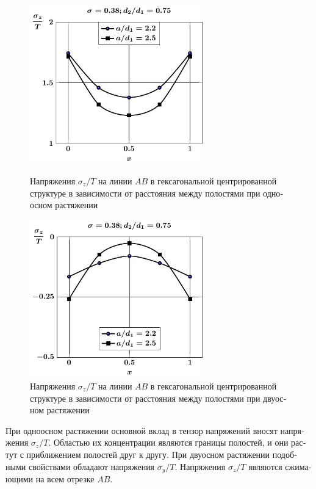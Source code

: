 \begin{russian}
\begin{figure}[h!]
\centering\footnotesize
\parbox[b]{7.5cm}{\centering\includegraphics[width=7.5cm]{cav13-a-d75-t1-sig_z.pdf}
\caption{Напряжения $\sigma_z/T$ на линии $AB$ в гексагональной центрированной структуре в зависимости от расстояния между полостями при одноосном растяжении 
\label{f:9:48}}}\hfil\hfil
\parbox[b]{7.5cm}{\centering\includegraphics[width=7.5cm]{cav13-a-d75-t2-sig_z.pdf}
\caption{Напряжения $\sigma_z/T$ на линии $AB$ в гексагональной центрированной структуре в зависимости от расстояния между полостями при двуосном растяжении
\label{f:9:49}}}
\end{figure}

При одноосном растяжении основной вклад в тензор напряжений вносят напряжения $\sigma_z/T$. Областью их концентрации являются границы полостей, и они растут с приближением полостей друг к другу. При двуосном растяжении подобными свойствами обладают напряжения $\sigma_y/T$. Напряжения $\sigma_z/T$ являются сжимающими на всем отрезке $AB$.


\end{russian}
